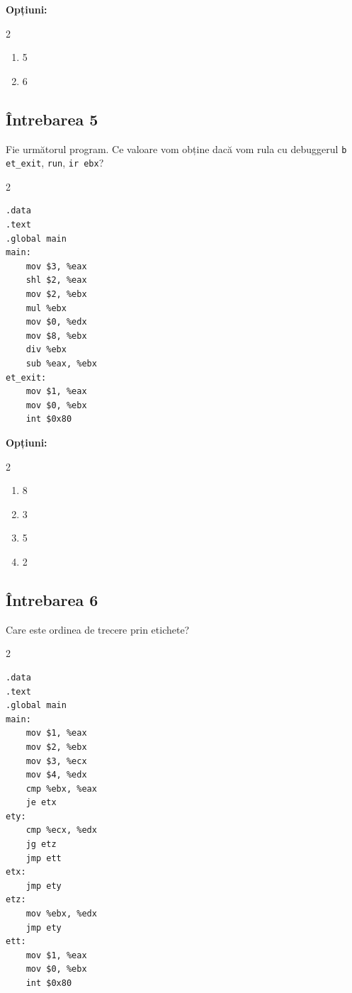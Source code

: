 \documentclass[12pt,a4paper]{article}
\begin{document}
\textbf{Opțiuni:}
\begin{multicols}{2}
\begin{enumerate}[label=\alph*)]
    \item 5
    \item 6
\end{enumerate}
\end{multicols}
\newpage

\subsection*{Întrebarea 5}
Fie următorul program. Ce valoare vom obține dacă vom rula cu debuggerul \texttt{b et\_exit}, \texttt{run}, \texttt{ir ebx}?
\begin{multicols}{2}
\begin{lstlisting}[language=x86asm]
.data
.text
.global main
main:
    mov $3, %eax
    shl $2, %eax
    mov $2, %ebx
    mul %ebx
    mov $0, %edx
    mov $8, %ebx
    div %ebx
    sub %eax, %ebx
et_exit:
    mov $1, %eax
    mov $0, %ebx
    int $0x80
\end{lstlisting}
\end{multicols}

\textbf{Opțiuni:}
\begin{multicols}{2}
\begin{enumerate}[label=\alph*)]
    \item 8
    \item 3
    \item 5
    \item 2
\end{enumerate}
\end{multicols}

\subsection*{Întrebarea 6}
Care este ordinea de trecere prin etichete?

\begin{multicols}{2}
\begin{lstlisting}[language=x86asm]
.data
.text
.global main
main:
    mov $1, %eax
    mov $2, %ebx
    mov $3, %ecx
    mov $4, %edx
    cmp %ebx, %eax
    je etx
ety:
    cmp %ecx, %edx
    jg etz
    jmp ett
etx:
    jmp ety
etz:
    mov %ebx, %edx
    jmp ety
ett:
    mov $1, %eax
    mov $0, %ebx
    int $0x80
\end{lstlisting}
\end{multicols}
\end{document}
